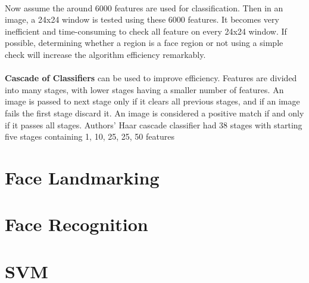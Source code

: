 	\paragraph{}Now assume the around 6000 features are used for classification. Then in an image, a 24x24 window is tested using these 6000 features. It becomes very inefficient and time-consuming to check all feature on every 24x24 window. If possible, determining whether a region is a face region or not using a simple check will increase the algorithm efficiency remarkably.
	
	\paragraph{}\textbf{Cascade of Classifiers} can be used to improve efficiency. Features are divided into many stages, with lower stages having a smaller number of features. An image is passed to next stage only if it clears all previous stages, and if an image fails the first stage discard it. An image is considered a positive match if and only if it passes all stages. Authors' Haar cascade classifier had 38 stages with starting five stages containing 1, 10, 25, 25, 50 features
	
\section{Face Landmarking}

\section{Face Recognition}

\section{SVM}
